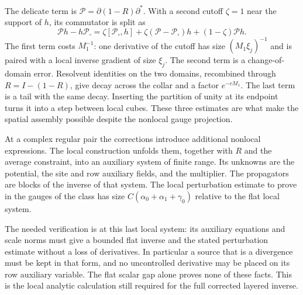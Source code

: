 \documentclass[11pt,letterpaper,reqno]{amsart}
\theoremstyle{definition}
\theoremstyle{remark}
\begin{document}
The delicate term is $\mathcal P=\partial(1-R)\partial^*$.
With a second cutoff $\zeta=1$ near the support of $h$,
its commutator is split as
\[
 \mathcal Ph-h\mathcal P_\square
 =\zeta[\mathcal P_\square,h]
   +\zeta(\mathcal P-\mathcal P_\square)h
   +(1-\zeta)\mathcal Ph.
\]
The first term costs $M_1^{-1}$: one derivative of the
cutoff has size $(M_1\xi_j)^{-1}$ and is paired with a
local inverse gradient of size $\xi_j$. The second term
is a change-of-domain error. Resolvent identities on the
two domains, recombined through $R=I-(1-R)$, give decay
across the collar and a factor $e^{-cM_1}$. The last term
is a tail with the same decay. Inserting the partition
of unity at its endpoint turns it into a step between
local cubes. These three estimates are what make the
spatial assembly possible despite the nonlocal gauge
projection.

At a complex regular pair the corrections introduce
additional nonlocal expressions. The local construction
unfolds them, together with $R$ and the average constraint,
into an auxiliary system of finite range. Its unknowns
are the potential, the site and row auxiliary fields,
and the multiplier. The propagators are blocks of the
inverse of that system. The local perturbation estimate
to prove in the gauges of the class has size
$C(\alpha_0+\alpha_1+\gamma_0)$ relative to the flat
local system.

The needed verification is at this last local system:
its auxiliary equations and scale norms must give a
bounded flat inverse and the stated perturbation estimate
without a loss of derivatives. In particular a source
that is a divergence must be kept in that form, and no
uncontrolled derivative may be placed on its row
auxiliary variable. The flat scalar gap alone proves
none of these facts. This is the local analytic
calculation still required for the full corrected
layered inverse.
\end{document}
